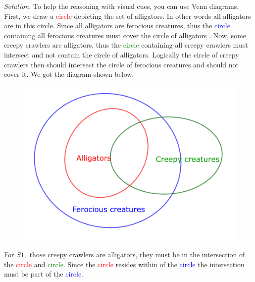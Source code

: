 \begin{multicols}{2}
	\vskip 0.1cm
	\textit{Solution.}
	To help the reasoning with visual cues, you can use Venn diagrams.
	\vskip 0.1cm
	First, we draw a \textcolor{red}{circle} depicting the set of alligators. In other words all alligators are in this circle.
	Since all alligators are ferocious creatures, thus the \textcolor{blue}{circle} containing all ferocious creatures must cover the circle of alligators .
	Now, some creepy crawlers are alligators, thus the \textcolor{green}{circle} containing all creepy crawlers must intersect and not contain the circle of alligators.
	Logically the circle of creepy crawlers then should intersect the circle of ferocious creatures and should not cover it.
	We got the diagram shown below.
	\begin{figure}[H]
		\vspace*{-5pt}
		\centering
		\captionsetup{labelformat= empty, justification=centering}
		\includegraphics[width= 1\linewidth]{pi-2023-01-03.pdf}
		\vspace*{-10pt}
	\end{figure}
	For $S1,$ those creepy crawlers are alligators, they must be in the intersection of the \textcolor{red}{circle} and \textcolor{green}{circle}.
	Since the \textcolor{red}{circle} resides within of the \textcolor{blue}{circle} the intersection must be part of the \textcolor{blue}{circle}.

\end{multicols}
